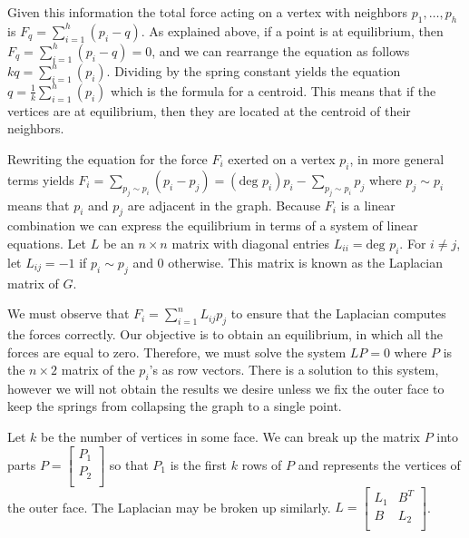 \documentclass[11pt]{article}
\theoremstyle{definition}
\begin{document}
		
	Given this information the total force acting on a vertex with neighbors $p_1, \dots, p_h$ is $F_q = \sum_{i=1}^{h}(p_i - q)$. 
	As explained above, if a point is at equilibrium, then $F_q = \sum_{i=1}^{h}(p_i - q) = 0$, and we can rearrange the equation as follows $kq = \sum_{i=1}^{h}(p_i)$. 
	Dividing by the spring constant yields the equation $q = \frac{1}{k}\sum_{i=1}^{h}(p_i)$ which is the formula for a centroid.
	This means that if the vertices are at equilibrium, then they are located at the centroid of their neighbors.
	
	Rewriting the equation for the force $F_i$ exerted on a vertex $p_i$, in more general terms yields $F_i = \sum_{p_j \sim p_i} (p_i-p_j) = (\text{deg } p_i)p_i - \sum_{p_j \sim p_i}p_j$ where $p_j \sim p_i$ means that $p_i$ and $p_j$ are adjacent in the graph.
	Because $F_i$ is a linear combination we can express the equilibrium in terms of a system of linear equations. 
	Let $L$ be an $n \times n$ matrix with diagonal entries $L_{ii} = \text{deg }p_i$. For $i \neq j$, let $L_{ij} = -1$ if $p_i \sim p_j$ and 0 otherwise.
	This matrix is known as the Laplacian matrix of $G$.
	
	We must observe that $F_i = \sum_{i =1}^{n}L_{ij}p_j$ to ensure that the Laplacian computes the forces correctly. 
	Our objective is to obtain an equilibrium, in which all the forces are equal to zero. 
	Therefore, we must solve the system $LP = 0$ where $P$ is the $n \times 2$ matrix of the $p_i$'s as row vectors. 
	There is a solution to this system, however we will not obtain the results we desire unless we fix the outer face to keep the springs from collapsing the graph to a single point. 
	
	Let $k$ be the number of vertices in some face. We can break up the matrix $P$ into parts $P = 
		\begin{bmatrix}
    			P_1 \\
    			P_2 \\
		\end{bmatrix} $ 
	so that $P_1$ is the first $k$ rows of $P$ and represents the vertices of the outer face. The Laplacian may be broken up similarly. $L = 
		\begin{bmatrix}
			L_1 & B^T \\
			B & L_2 \\
		\end{bmatrix}$. 
		
\end{document}
